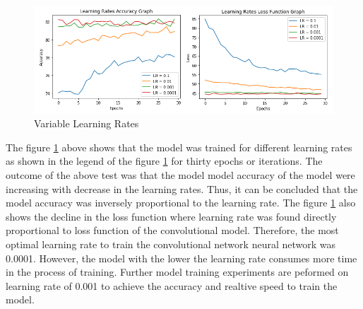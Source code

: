 \begin{figure}[!htp]
    \centering
    \includegraphics[width=15cm]{Images/lr.png}
    \caption{Variable Learning Rates}
    \label{fig:lrates}
\end{figure}

The figure \ref{fig:lrates} above shows that the model was trained for different learning rates as shown
in the legend of the figure \ref{fig:lrates} for thirty epochs or iterations. The outcome of the above test 
was that the model model accuracy of the model were increasing with decrease in the learning rates. Thus, it 
can be concluded that the model accuracy was  inversely proportional to the learning rate. The figure \ref{fig:lrates} also shows the 
decline in the loss function where learning rate was found directly proportional to loss function of the 
convolutional model. Therefore, the most optimal learning rate to train the convolutional network 
neural network was 0.0001. However, the model with the lower the learning rate consumes more time in the 
process of training. Further model training experiments are peformed on 
learning rate of 0.001 to achieve the accuracy and realtive speed to train the model.

